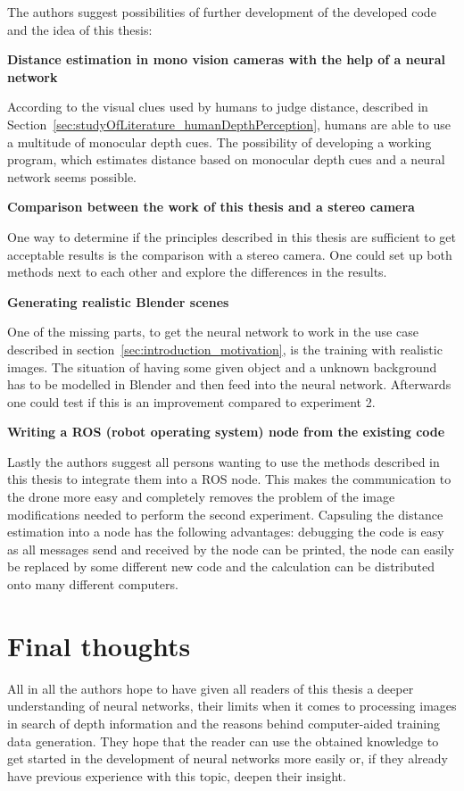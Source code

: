 The authors suggest possibilities of further development of the developed code and the idea of this thesis:

\textbf{Distance estimation in mono vision cameras with the help of a neural network}

According to the visual clues used by humans to judge distance, described in Section~\ref{sec:studyOfLiterature_humanDepthPerception}, humans are able to use a multitude of monocular depth cues. The possibility of developing a working program, which estimates distance based on monocular depth cues and a neural network seems possible.

\textbf{Comparison between the work of this thesis and a stereo camera}

One way to determine if the principles described in this thesis are sufficient to get acceptable results is the comparison with a stereo camera. One could set up both methods next to each other and explore the differences in the results.

\textbf{Generating realistic Blender scenes}

One of the missing parts, to get the neural network to work in the use case described in section~\ref{sec:introduction_motivation}, is the training with realistic images. The situation of having some given object and a unknown background has to be modelled in Blender and then feed into the neural network. Afterwards one could test if this is an improvement compared to experiment 2.

\textbf{Writing a ROS (robot operating system) node from the existing code}

Lastly the authors suggest all persons wanting to use the methods described in this thesis to integrate them into a ROS node. This makes the communication to the drone more easy and completely removes the problem of the image modifications needed to perform the second experiment. Capsuling the distance estimation into a node has the following advantages: debugging the code is easy as all messages send and received by the node can be printed, the node can easily be replaced by some different new code and the calculation can be distributed onto many different computers.

\section{Final thoughts}

All in all the authors hope to have given all readers of this thesis a deeper understanding of neural networks, their limits when it comes to processing images in search of depth information and the reasons behind computer-aided training data generation. They hope that the reader can use the obtained knowledge to get started in the development of neural networks more easily or, if they already have previous experience with this topic, deepen their insight.

\filbreak